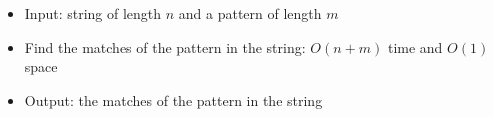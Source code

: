 \begin{itemize}
	\item Input: string of length $n$ and a pattern of length $m$
	\item Find the matches of the pattern in the string: $O(n+m)$ time and $O(1)$ space
	\item Output: the matches of the pattern in the string
\end{itemize}